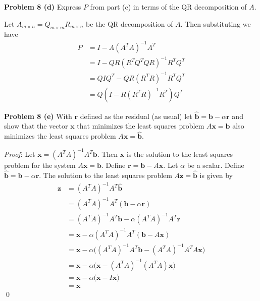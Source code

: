 \documentclass[12pt]{article}
\newcommand{\problem}[1]{\hspace{-4 ex} \large \textbf{Problem #1} }
\renewenvironment{proof}{\hspace{-4 ex} \emph{Proof}:}{\qed}
\begin{document}
\bigbreak

\problem{8 (d)} Express $P$ from part (c) in terms of the QR decomposition of $A$. \bigbreak

Let $A_{m \times n} = Q_{m \times m} R_{m \times n}$ be the QR decomposition of $A$. Then substituting we have
\begin{align*}
	P & = I - A (A^TA)^{-1}A^T \\
	& = I - QR (R^TQ^TQR)^{-1}R^TQ^T \\
	& = QIQ^T - QR (R^TR)^{-1}R^TQ^T \\
	& = Q(I - R (R^TR)^{-1}R^T)Q^T
\end{align*}

\bigbreak

\problem{8 (e)} With $\mathbf{r}$ defined as the residual (as usual) let $\hat{\mathbf{b}} = \mathbf{b} - \alpha \mathbf{r}$ and show that the vector $\mathbf{x}$ that minimizes the least squares problem $A\mathbf{x} = \mathbf{b}$ also minimizes the least squares problem $A\mathbf{x} = \hat{\mathbf{b}}$.

\begin{proof}
	Let $\mathbf{x} = (A^TA)^{-1}A^T\mathbf{b}$. Then $\mathbf{x}$ is the solution to the least squares problem for the system $A\mathbf{x} = \mathbf{b}$. Define $\mathbf{r} = \mathbf{b} - A \mathbf{x}$. Let $\alpha$ be a scalar. Define $\hat{\mathbf{b}} = \mathbf{b} - \alpha \mathbf{r}$. The solution to the least squares problem $A\mathbf{z} = \hat{\mathbf{b}}$ is given by
	\begin{align*}
		\mathbf{z} & = (A^TA)^{-1}A^T \hat{\mathbf{b}} \\
		& = (A^TA)^{-1}A^T (\mathbf{b} - \alpha \mathbf{r}) \\
		& = (A^TA)^{-1}A^T \mathbf{b} - \alpha (A^TA)^{-1}A^T \mathbf{r} \\
		& = \mathbf{x} - \alpha (A^TA)^{-1}A^T (\mathbf{b} - A \mathbf{x}) \\
		& = \mathbf{x} - \alpha \big(  (A^TA)^{-1}A^T \mathbf{b} - (A^TA)^{-1}A^T A \mathbf{x} \big) \\
		& = \mathbf{x} - \alpha \big(  \mathbf{x} - (A^TA)^{-1}(A^T A) \mathbf{x} \big) \\
		& = \mathbf{x} - \alpha \big(  \mathbf{x} - I \mathbf{x} \big) \\
		& = \mathbf{x}
	\end{align*}
\end{proof}
\end{document}
